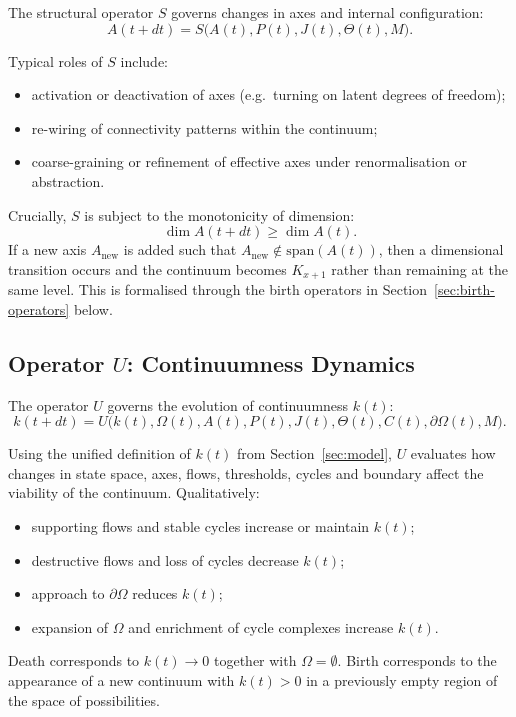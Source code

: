 The structural operator \(S\) governs changes in axes and internal
configuration:
\[
  A(t+dt) = S\big(A(t), P(t), J(t), \Theta(t), M\big).
\]

Typical roles of \(S\) include:
\begin{itemize}
  \item activation or deactivation of axes (e.g.\ turning on latent degrees of
        freedom);
  \item re-wiring of connectivity patterns within the continuum;
  \item coarse-graining or refinement of effective axes under renormalisation
        or abstraction.
\end{itemize}

Crucially, \(S\) is subject to the monotonicity of dimension:
\[
  \dim A(t+dt) \ge \dim A(t).
\]
If a new axis \(A_{\mathrm{new}}\) is added such that
\(A_{\mathrm{new}} \notin \mathrm{span}(A(t))\), then a dimensional transition
occurs and the continuum becomes \(K_{x+1}\) rather than remaining at the same
level. This is formalised through the birth operators in
Section~\ref{sec:birth-operators} below.

\subsection{Operator \texorpdfstring{\texorpdfstring{$U$}{U}}{U}: Continuumness Dynamics}

The operator \(U\) governs the evolution of continuumness \(k(t)\):
\[
  k(t+dt) =
  U\big(k(t), \Omega(t), A(t), P(t), J(t),
        \Theta(t), C(t), \partial\Omega(t), M\big).
\]

Using the unified definition of \(k(t)\) from Section~\ref{sec:model}, \(U\)
evaluates how changes in state space, axes, flows, thresholds, cycles and
boundary affect the viability of the continuum. Qualitatively:
\begin{itemize}
  \item supporting flows and stable cycles increase or maintain \(k(t)\);
  \item destructive flows and loss of cycles decrease \(k(t)\);
  \item approach to \(\partial\Omega\) reduces \(k(t)\);
  \item expansion of \(\Omega\) and enrichment of cycle complexes increase
        \(k(t)\).
\end{itemize}

Death corresponds to \(k(t) \to 0\) together with \(\Omega = \emptyset\).
Birth corresponds to the appearance of a new continuum with
\(k(t) > 0\) in a previously empty region of the space of possibilities.

